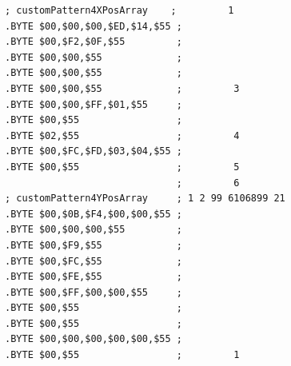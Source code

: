 \begin{minipage}[b]{0.42\linewidth}
\begin{lrbox}{\mybox}%
\begin{lstlisting}[basicstyle=\ttfamily\tiny]
 ; customPattern4XPosArray    ;         1             
.BYTE $00,$00,$00,$ED,$14,$55 ;                       
.BYTE $00,$F2,$0F,$55         ;                       
.BYTE $00,$00,$55             ;                       
.BYTE $00,$00,$55             ;                       
.BYTE $00,$00,$55             ;         3             
.BYTE $00,$00,$FF,$01,$55     ;                       
.BYTE $00,$55                 ;                       
.BYTE $02,$55                 ;         4             
.BYTE $00,$FC,$FD,$03,$04,$55 ;                       
.BYTE $00,$55                 ;         5             
                              ;         6             
; customPattern4YPosArray     ; 1 2 99 6106899 21    
.BYTE $00,$0B,$F4,$00,$00,$55 ;                       
.BYTE $00,$00,$00,$55         ;                       
.BYTE $00,$F9,$55             ;                       
.BYTE $00,$FC,$55             ;                       
.BYTE $00,$FE,$55             ;                       
.BYTE $00,$FF,$00,$00,$55     ;                       
.BYTE $00,$55                 ;                       
.BYTE $00,$55                 ;                       
.BYTE $00,$00,$00,$00,$00,$55 ;                       
.BYTE $00,$55                 ;         1             
\end{lstlisting}
\end{lrbox}%
\scalebox{0.8}{\usebox{\mybox}}

\end{minipage}

